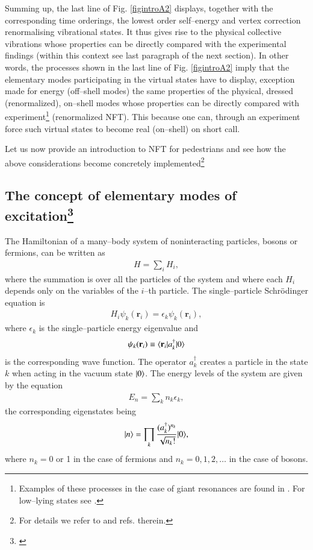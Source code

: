Summing up, the last line of Fig. \ref{figintroA2} displays, together with the corresponding time orderings, the lowest order self--energy and vertex correction renormalising vibrational states. It thus gives rise to the physical collective vibrations whose properties can be directly compared with the experimental findings (within this context see last paragraph of the next section). In other words, the processes shown in the last line of   Fig. \ref{figintroA2} imply that the elementary modes participating in the virtual states have to display, exception made for energy (off--shell modes) the same properties of the physical, dressed (renormalized), on--shell modes whose properties can be directly compared with experiment\footnote{Examples of these processes in the case of giant resonances are found in \cite{Bortignon:81,Bertsch:83}. For low--lying states see \cite{Barranco:04}.} (renormalized NFT). This because one can, through an experiment
force such virtual states to become real (on--shell) on short call.

Let us now provide an introduction to NFT for pedestrians and see how the above considerations become concretely implemented\footnote{For details we refer to \cite{Bortignon:77} and refs. therein.}
\subsection[The concept of elementary modes of excitation]{The concept of elementary modes of excitation\protect\footnote{\cite{Bes:77}}}\label{C1S7.1}
The Hamiltonian of a many--body system of noninteracting particles, bosons or fermions, can be written as
\begin{align}\label{eqC1A1}
H=\sum_iH_i,
\end{align}
where the summation is over all the particles of the system and where each $H_i$ depends only on the variables of the $i$--th particle. The single--particle Schr\"odinger equation is
\begin{align}\label{eqC1A2}
H_i\psi_k(\mathbf r_i)=\epsilon_k \psi_k(\mathbf r_i),
\end{align}
where $\epsilon_k$ is the single--particle energy eigenvalue and 
\begin{align}\label{eqC1A3}
\psi_k(\mathbf r_i)\equiv\langle {\mathbf r_i}|a_k^\dagger|{0} \rangle
\end{align}
is the corresponding wave function. The operator $a_k^\dagger$ creates a particle in the state $k$ when acting in the vacuum state $|{0} \rangle$. The energy levels of the system are given by the equation
\begin{align}\label{eqC1A4}
E_n=\sum_k n_k\epsilon_k,
\end{align}
the corresponding eigenstates being
\begin{align}\label{eqC1A5}
|{n} \rangle=\prod_k\frac{(a_k^\dagger)^{n_k}}{\sqrt{n_k!}}|{0} \rangle,
\end{align}
where $n_k=0$ or 1 in the case of fermions and $n_k=0,1,2,\dots$ in the case of bosons.

